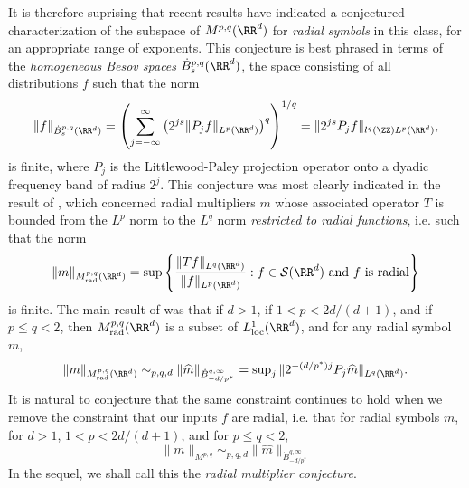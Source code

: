It is therefore suprising that recent results have indicated a conjectured characterization of the subspace of $M^{p,q}(\RR^d)$ for \emph{radial symbols} in this class, for an appropriate range of exponents. This conjecture is best phrased in terms of the \emph{homogeneous Besov spaces} $\dot{B}^{p,q}_s(\RR^d)$, the space consisting of all distributions $f$ such that the norm
%
\[ \| f \|_{\dot{B}^{p,q}_s(\RR^d)} = \left( \sum_{j = -\infty}^\infty \left( 2^{js} \| P_j f \|_{L^p(\RR^d)} \right)^q \right)^{1/q} = \| 2^{js} P_j f \|_{l^q(\ZZ) L^p(\RR^d)}, \]
%
is finite, where $P_j$ is the Littlewood-Paley projection operator onto a dyadic frequency band of radius $2^j$. This conjecture was most clearly indicated in the result of \cite{GarrigosandSeeger}, which concerned radial multipliers $m$ whose associated operator $T$ is bounded from the $L^p$ norm to the $L^q$ norm \emph{restricted to radial functions}, i.e. such that the norm
%
\[ \| m \|_{M^{p,q}_{\text{rad}}(\RR^d)} = \sup \left\{ \frac{\| Tf \|_{L^q(\RR^d)}}{\| f \|_{L^p(\RR^d)}} : f \in \mathcal{S}(\RR^d)\ \text{and $f$ is radial} \right\} \]
%
is finite. The main result of \cite{GarrigosandSeeger} was that if $d > 1$, if $1 < p < 2d/(d+1)$, and if $p \leq q < 2$, then $M^{p,q}_{\text{rad}}(\RR^d)$ is a subset of $L^1_{\text{loc}}(\RR^d)$, and for any radial symbol $m$,
%
\[ \| m \|_{M^{p,q}_{\text{rad}}(\RR^d)} \sim_{p,q,d} \| \widehat{m} \|_{\dot{B}^{q,\infty}_{-d/p^*}} = \sup\nolimits_j \| 2^{-(d/p^*) j} P_j \widehat{m} \|_{L^q(\RR^d)}. \]
%
It is natural to conjecture that the same constraint continues to hold when we remove the constraint that our inputs $f$ are radial, i.e. that for radial symbols $m$, for $d > 1$, $1 < p < 2d/(d+1)$, and for $p \leq q < 2$,
%
\[ \| m \|_{M^{p,q}} \sim_{p,q,d} \| \widehat{m} \|_{\dot{B}_{-d/p^*}^{q,\infty}} \]
%
In the sequel, we shall call this the \emph{radial multiplier conjecture}.



